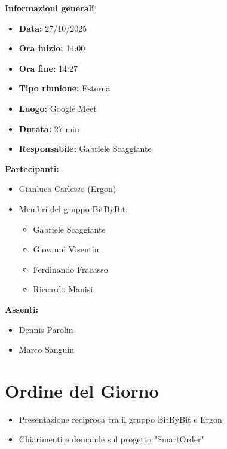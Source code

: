 \documentclass[a4paper,12pt]{article}
\begin{document}
\clearpage
{\large \textbf{Informazioni generali}}
{\footnotesize
{}

\begin{itemize}
    \item \textbf{Data:} 27/10/2025
    \item \textbf{Ora inizio:} 14:00
    \item \textbf{Ora fine:} 14:27
    \item \textbf{Tipo riunione:} Esterna
    \item \textbf{Luogo:} Google Meet
    \item \textbf{Durata:} 27 min
    \item \textbf{Responsabile:} Gabriele Scaggiante
\end{itemize}

\vspace{0.2cm}

\textbf{Partecipanti:}
\begin{itemize}
    \item Gianluca Carlesso (Ergon)
    \item Membri del gruppo BitByBit:
    \begin{itemize}
        \item Gabriele Scaggiante
        \item Giovanni Visentin
        \item Ferdinando Fracasso
        \item Riccardo Manisi
    \end{itemize}
\end{itemize}

\textbf{Assenti:}
\begin{itemize}
    \item Dennis Parolin
    \item Marco Sanguin
\end{itemize}
}

\vspace{0.5cm}

\vspace{0.8cm}

\clearpage
\tableofcontents
\thispagestyle{empty} %
\clearpage

\section{Ordine del Giorno}
\begin{itemize}
    \item Presentazione reciproca tra il gruppo BitByBit e Ergon
    \item Chiarimenti e domande sul progetto "SmartOrder"
\end{itemize}
\end{document}
